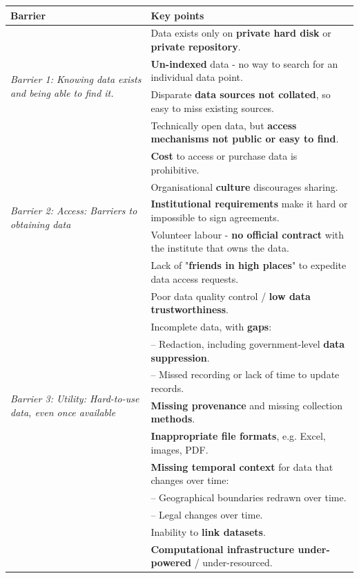 \documentclass{CUP-JNL-DAP}%
\begin{document}
\begin{table}
    \centering
    \begin{tabular}{ | l | l| }
       \hline
       \textbf{Barrier} & \textbf{Key points} \\
       \hline
         \multirow{4}{10em}{\textit{Barrier 1: Knowing data exists and being able to find it.}} 
          & Data exists only on \textbf{private hard disk} or \textbf{private repository}.\\
          & \textbf{Un-indexed} data - no way to search for an individual data point.\\
          & Disparate \textbf{data sources not collated}, so easy to miss existing sources.\\
          & Technically open data, but \textbf{access mechanisms not public or easy to find}. \\
         \hline
          \multirow{5}{10em}{\textit{Barrier 2: Access: Barriers to obtaining data}} 
         & \textbf{Cost} to access or purchase data is prohibitive. \\
         & Organisational \textbf{culture} discourages sharing.\\
         & \textbf{Institutional requirements} make it hard or impossible to sign agreements. \\
         & Volunteer labour - \textbf{no official contract} with the institute that owns the data. \\
         & Lack of "\textbf{friends in high places}" to expedite data access requests.\\
         \hline
         \multirow{9}{10em}{\textit{Barrier 3: Utility: Hard-to-use data, even once available}} 
         & Poor data quality control / \textbf{low data trustworthiness}.\\
         & Incomplete data, with \textbf{gaps}: \\
         & -- Redaction, including government-level \textbf{data suppression}.\\
         & -- Missed recording or lack of time to update records.\\
         & \textbf{Missing provenance} and missing collection \textbf{methods}. \\
         & \textbf{Inappropriate file formats}, e.g. Excel, images, PDF.\\
         & \textbf{Missing \textbf{temporal} context} for data that changes over time:\\
         & -- Geographical boundaries redrawn over time.\\
         & -- Legal changes over time. \\
         & Inability to \textbf{link datasets}. \\
         & \textbf{Computational infrastructure under-powered} / under-resourced. \\
           

\end{tabular}
\end{table}
\end{document}
